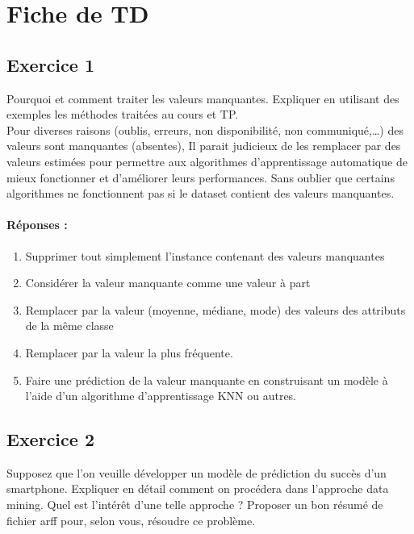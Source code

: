 \documentclass[a4paper, 12pt]{article}
\begin{document}
	

	    \printbibliography
	\newpage
	\section{\textbf{Fiche de TD} }
	\subsection*{Exercice 1}Pourquoi et comment traiter les valeurs manquantes.                                  Expliquer en utilisant des exemples les méthodes traitées au cours et TP.               \\ Pour diverses raisons (oublis, erreurs, non disponibilité, non communiqué,…) des valeurs sont manquantes (absentes), Il parait judicieux de les remplacer par des valeurs estimées pour permettre aux algorithmes d’apprentissage automatique de mieux fonctionner et d’améliorer leurs performances. Sans oublier que certains algorithmes ne fonctionnent pas si le dataset contient des valeurs manquantes. 
	\paragraph{Réponses :}
	\begin{enumerate}
		\item \justifying Supprimer tout simplement l’instance contenant des valeurs manquantes 
		\item \justifying Considérer la valeur manquante comme une valeur à part
		\item \justifying Remplacer par la valeur (moyenne, médiane, mode) des valeurs des attributs de la même classe
		\item \justifying Remplacer par la valeur la plus fréquente.
		\item \justifying Faire une prédiction de la valeur manquante en construisant un modèle à l’aide d’un algorithme d’apprentissage KNN ou autres.
	\end{enumerate}
	\subsection*{Exercice 2} Supposez que l’on veuille développer un modèle de prédiction du succès d’un smartphone.  Expliquer en détail comment on procédera dans l’approche data mining.  Quel est l’intérêt d’une telle approche ?  Proposer un bon résumé de fichier arff pour, selon vous, résoudre ce problème.
\end{document}
